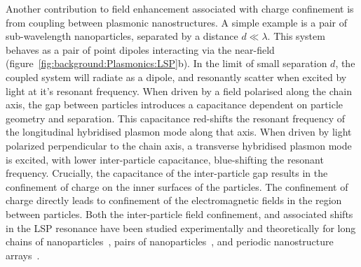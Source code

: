 Another contribution to field enhancement associated with charge confinement is from coupling between plasmonic nanostructures. A simple example is a pair of sub-wavelength nanoparticles, separated by a distance $d \ll \lambda$. This system behaves as a pair of point dipoles interacting via the near-field (figure~\ref{fig:background:Plasmonics:LSP}b). In the limit of small separation $d$, the coupled system will radiate as a dipole, and resonantly scatter when excited by light at it's resonant frequency. When driven by a field polarised along the chain axis, the gap between particles introduces a capacitance dependent on particle geometry and separation. This capacitance red-shifts the resonant frequency of the longitudinal hybridised plasmon mode along that axis. When driven by light polarized perpendicular to the chain axis, a transverse hybridised plasmon mode is excited, with lower inter-particle capacitance, blue-shifting the resonant frequency. Crucially, the capacitance of the inter-particle gap results in the confinement of charge on the inner surfaces of the particles. The confinement of charge directly leads to confinement of the electromagnetic fields in the region between particles. Both the inter-particle field confinement, and associated shifts in the LSP resonance have been studied experimentally and theoretically for long chains of nanoparticles~\cite{Krenn1999, Krenn1999a}, pairs of nanoparticles~\cite{Huang2016}, and periodic nanostructure arrays~\cite{Lee2016, Valev2011b, Valev2012a}.

